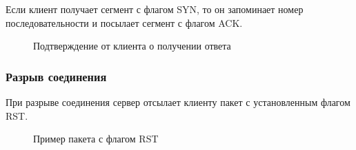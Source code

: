 \documentclass[a4paper, 14pt,russian]{article}
\begin{document}
		Если клиент получает сегмент с флагом SYN, то он запоминает номер последовательности и посылает сегмент с флагом ACK.
		\begin{figure}[h!]
			\caption{Подтверждение от клиента о получении ответа}
			\label{img:tcp_ack}
		\end{figure}
	\subsubsection{Разрыв соединения}
		При разрыве соединения сервер отсылает клиенту пакет с установленным флагом RST.
		\begin{figure}[h!]
			\caption{Пример пакета с флагом RST}
			\label{img:tcp_reset}
		\end{figure}
	\newpage
\end{document}
